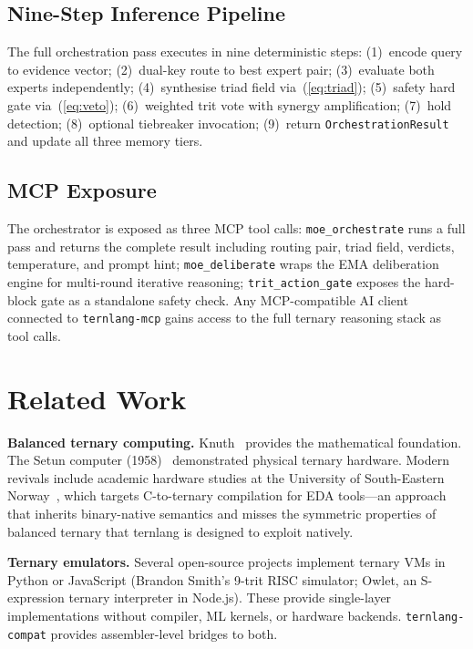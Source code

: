 \documentclass[journal,10pt,twocolumn]{IEEEtran}
\begin{document}
\subsection{Nine-Step Inference Pipeline}

The full orchestration pass executes in nine deterministic steps:
(1)~encode query to evidence vector;
(2)~dual-key route to best expert pair;
(3)~evaluate both experts independently;
(4)~synthesise triad field via~(\ref{eq:triad});
(5)~safety hard gate via~(\ref{eq:veto});
(6)~weighted trit vote with synergy amplification;
(7)~hold detection;
(8)~optional tiebreaker invocation;
(9)~return \texttt{OrchestrationResult} and update all three memory tiers.

\subsection{MCP Exposure}

The orchestrator is exposed as three MCP tool calls:
\texttt{moe\_orchestrate} runs a full pass and returns the complete result
including routing pair, triad field, verdicts, temperature, and prompt hint;
\texttt{moe\_deliberate} wraps the EMA deliberation engine for multi-round
iterative reasoning; \texttt{trit\_action\_gate} exposes the hard-block gate
as a standalone safety check. Any MCP-compatible AI client connected to
\texttt{ternlang-mcp} gains access to the full ternary reasoning stack as
tool calls.

\section{Related Work}
\label{sec:related}

\textbf{Balanced ternary computing.} Knuth~\cite{knuth1997art} provides the
mathematical foundation. The Setun computer (1958)~\cite{brousentsov2002setun}
demonstrated physical ternary hardware. Modern revivals include academic
hardware studies at the University of South-Eastern Norway~\cite{bos2020ternary},
which targets C-to-ternary compilation for EDA tools—an approach that inherits
binary-native semantics and misses the symmetric properties of balanced ternary
that ternlang is designed to exploit natively.

\textbf{Ternary emulators.} Several open-source projects implement ternary
VMs in Python or JavaScript (Brandon Smith's 9-trit RISC simulator; Owlet,
an S-expression ternary interpreter in Node.js). These provide single-layer
implementations without compiler, ML kernels, or hardware backends.
\texttt{ternlang-compat} provides assembler-level bridges to both.
\end{document}
